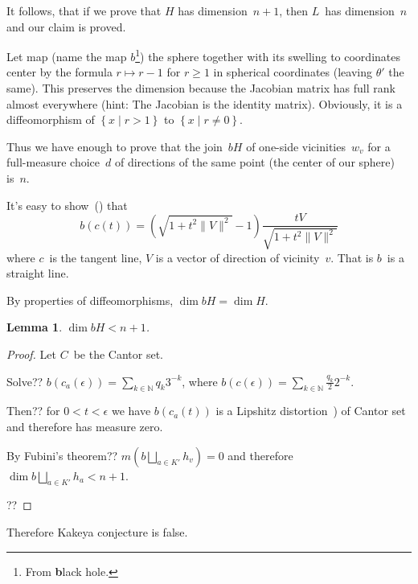 \documentclass[oneside,draft]{amsart}
\newcommand{\setcond}[2]{\left\{#1\mid#2\right\}}
\newcommand{\norm}[1]{\lVert #1\rVert}
\newtheorem{lem}{Lemma}
\begin{document}
It follows, that if we prove that $H$ has dimension~$n+1$, then $L$~has dimension~$n$ and our claim is proved.

Let map (name the map $b$\footnote{From \textbf{b}lack hole.}) the sphere together with its swelling to coordinates center by the formula $r\mapsto r-1$ for $r\geq 1$ in spherical coordinates (leaving $\theta'$ the same).
This preserves the dimension because the Jacobian matrix has full rank almost everywhere (hint: The Jacobian is the identity matrix).
Obviously, it is a diffeomorphism of $\setcond{x}{r>1}$ to $\setcond{x}{r\ne 0}$.

Thus we have enough to prove that the join~$bH$ of one-si\-de vicinities~$w_v$ for a full-me\-a\-su\-re choice~$d$ of directions of the same point (the center of our sphere) is~$n$. 

It's easy to show~(\cite{curve}) that
\[ b(c(t)) = \left(\sqrt{1+t^2\norm{V}^2}-1\right)\frac{tV}{\sqrt{1+t^2\norm{V}^2}} \]
where $c$~is the tangent line, $V$ is a vector of direction of vicinity~$v$.
That is $b$~is a straight line.

By properties of diffeomorphisms, $\dim bH = \dim H$.

\begin{lem}
$\dim bH<n+1$.
\end{lem}

\begin{proof}
Let $C$~be the Cantor set.

Solve?? $b(c_a(\epsilon)) = \sum_{k\in\mathbb{N}}q_k 3^{-k}$, where $b(c(\epsilon)) = \sum_{k\in\mathbb{N}}\frac{q_k}{2} 2^{-k}$.

Then?? for $0<t<\epsilon$ we have $b(c_a(t))$ is a Lipshitz distortion~\cite{Cantor-distort}) of Cantor set and therefore has measure zero.

By Fubini's theorem?? $m(b\bigsqcup_{a\in K'}h_v) = 0$ and therefore $\dim b\bigsqcup_{a\in K'}h_a<n+1$.

??
\end{proof}


Therefore Kakeya conjecture is false.
\end{document}
